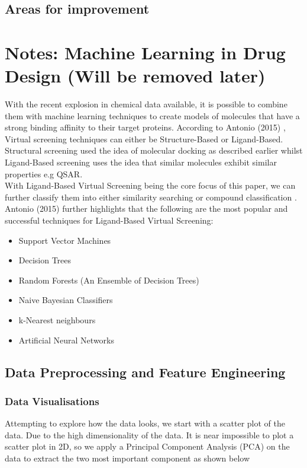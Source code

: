 \documentclass[a4paper,12pt]{report}
\begin{document}
	\section{Areas for improvement}


\chapter[Notes]{Notes: Machine Learning in Drug Design (Will be removed later)}
	With the recent explosion in chemical data available, it is possible to combine them with machine learning techniques to create models of molecules that have a strong binding affinity to their target proteins. According to Antonio (2015) \cite{Antonio2015}, Virtual screening techniques can either be Structure-Based or Ligand-Based. Structural screening used the idea of molecular docking as described earlier whilst Ligand-Based screening uses the idea that similar molecules exhibit similar properties e.g QSAR. 
	\\
	With Ligand-Based Virtual Screening being the core focus of this paper, we can further classify them into either similarity searching or compound classification \cite{Antonio2015}. Antonio (2015) \cite{Antonio2015} further highlights that the following are the most popular and successful techniques for Ligand-Based Virtual Screening:
	\begin{itemize}
		\item Support Vector Machines
		\item Decision Trees
		\item Random Forests (An Ensemble of Decision Trees)
		\item Naive Bayesian Classifiers
		\item k-Nearest neighbours
		\item Artificial Neural Networks
	\end{itemize}
	\section{Data Preprocessing and Feature Engineering}
		\subsection{Data Visualisations}
		Attempting to explore how the data looks, we start with a scatter plot of the data. Due to the high dimensionality of the data. It is near impossible to plot a scatter plot in 2D, so we apply a Principal Component Analysis (PCA) on the data to extract the two most important component as shown below
\end{document}
